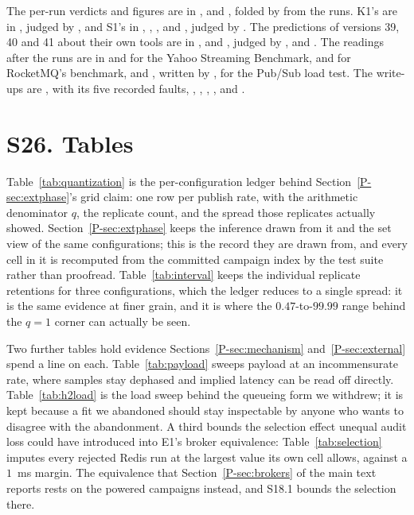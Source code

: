 \documentclass[10pt,journal,onecolumn]{IEEEtran}
\newcommand{\redis}{Redis}
\newcommand{\mainModeB}{\ref{P-sec:external}}              %
\newcommand{\mainPhase}{\ref{P-sec:extphase}}            %
\newcommand{\mainModeA}{\ref{P-sec:mechanism}}             %
\newcommand{\mainBrokers}{\ref{P-sec:brokers}}        %
\begin{document}
The per-run verdicts and figures are in ,
 and , folded by  from the runs.
K1's are in , judged by , and S1's in
, , ,  and
, judged by . The predictions of versions 39, 40 and 41
about their own tools are in ,  and
, judged by ,  and
. The readings after the runs are in
 and  for the Yahoo Streaming Benchmark,
 and  for RocketMQ's benchmark, and
, written by , for the Pub/Sub load test.
The write-ups
are , with its five recorded faults,
,
,
,
,
 and
.

\section{S26. Tables}

Table~\ref{tab:quantization} is the per-configuration ledger behind Section~\mainPhase{}'s grid claim: one row
per publish rate, with the arithmetic denominator $q$, the replicate count, and the spread those
replicates actually showed. Section~\mainPhase{} keeps the inference drawn from it and the set view
of the same configurations; this is the record they are drawn from, and every cell in it is recomputed
from the committed campaign index by the test suite rather than proofread.
Table~\ref{tab:interval} keeps the
individual replicate retentions for three configurations, which the ledger reduces to a single
spread: it is the same evidence at finer grain, and it is where the $0.47$-to-$99.99$
range behind the $q=1$ corner can actually be seen.

Two further tables hold evidence Sections~\mainModeA{} and~\mainModeB{} spend a line on each. Table~\ref{tab:payload}
sweeps payload at an incommensurate rate, where samples stay dephased and implied latency can
be read off directly. Table~\ref{tab:h2load} is the load sweep behind the queueing form we
withdrew; it is kept because a fit we abandoned should stay inspectable by anyone who wants to
disagree with the abandonment. A third bounds the selection effect unequal audit loss could
have introduced into E1's broker equivalence: Table~\ref{tab:selection} imputes every rejected
\redis{} run at the largest value its own cell allows, against a $1$~ms margin. The
equivalence that Section~\mainBrokers{} of the main text reports rests on the powered campaigns
instead, and S18.1 bounds the selection there.
\end{document}
